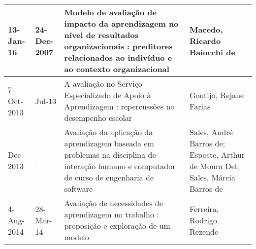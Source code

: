 \begin{table}
{\begin{tabular}{|m{1.3cm}|m{1.3cm}|p{7cm}|p{6cm}|}
13-Jan-16   & 24-Dec-2007 & Modelo de avaliação de impacto da aprendizagem no nível de resultados organizacionais : preditores relacionados ao indivíduo e ao contexto organizacional                                                             & Macedo, Ricardo Baiocchi de                                                                                                                                                                                                                                  \\ \hline
7-Oct-2013  & Jul-13      & A avaliação no Serviço Especializado de Apoio à Aprendizagem : repercussões no desempenho escolar                                                                                                                     & Gontijo, Rejane Farias                                                                                                                                                                                                                                       \\ \hline
Dec-2013    & -           & Avaliação da aplicação da aprendizagem baseada em problemas na disciplina de interação humano e computador de curso de engenharia de software                                                                         & Sales, André Barros de; Esposte, Arthur de Moura Del; Sales, Márcia Barros de                                                                                                                                                                                \\ \hline
4-Aug-2014  & 28-Mar-14   & Avaliação de necessidades de aprendizagem no trabalho : proposição e exploração de um modelo                                                                                                                          & Ferreira, Rodrigo Rezende                                                                                                                                                                                                                                    \\ \hline
\end{tabular}}
\end{table}





